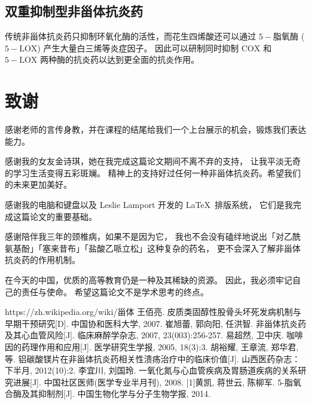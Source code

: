 \documentclass[12pt, a4paper, oneside]{ctexart}
\begin{document}
\subsection{双重抑制型非甾体抗炎药}
传统非甾体抗炎药只抑制环氧化酶的活性，而花生四烯酸还可以通过 $\mathrm{5-}$脂氧酶 ($\mathrm{5-LOX}$) 产生大量白三烯等炎症因子\cite{ref7}。
因此可以研制同时抑制 $\mathrm{COX}$ 和 $\mathrm{5-LOX}$ 两种酶的抗炎药以达到更全面的抗炎作用。

\newpage
\section*{致谢}
感谢老师的言传身教，并在课程的结尾给我们一个上台展示的机会，锻炼我们表达能力。

感谢我的女友金诗琪，她在我完成这篇论文期间不离不弃的支持，
让我平淡无奇的学习生活变得五彩斑斓。
精神上的支持好过任何一种非甾体抗炎药。希望我们的未来更加美好。

感谢我的电脑和键盘以及 Leslie Lamport 开发的 \LaTeX \ 排版系统，
它们是我完成这篇论文的重要基础。

感谢陪伴我三年的颈椎病，如果不是因为它，
我也不会没有磕绊地说出「对乙酰氨基酚」「塞来昔布」「盐酸乙哌立松」这种复杂的药名，
更不会深入了解非甾体抗炎药的作用机制。

在今天的中国，优质的高等教育仍是一种及其稀缺的资源。
因此，我必须牢记自己的责任与使命。
希望这篇论文不是学术思考的终点。

\begin{thebibliography}{99}

    https://zh.wikipedia.org/wiki/甾体
    王佰亮. 皮质类固醇性股骨头坏死发病机制与早期干预研究[D]. 中国协和医科大学, 2007.
    崔旭蕾, 郭向阳, 任洪智. 非甾体抗炎药及其心血管风险[J]. 临床麻醉学杂志, 2007, 23(003):256-257.
    易超然, 卫中庆. 咖啡因的药理作用和应用[J]. 医学研究生学报, 2005, 18(3):3.
    胡裕耀, 王章流, 郑华君,等. 铝碳酸镁片在非甾体抗炎药相关性溃疡治疗中的临床价值[J]. 山西医药杂志：下半月, 2012(10):2.
    李宜川, 刘国玲. 一氧化氮与心血管疾病及胃肠道疾病的关系研究进展[J]. 中国社区医师(医学专业半月刊), 2008.
    [1]黄凯, 蒋世云, 陈柳军. 5-脂氧合酶及其抑制剂[J]. 中国生物化学与分子生物学报, 2014.
    
\end{thebibliography}
\end{document}
